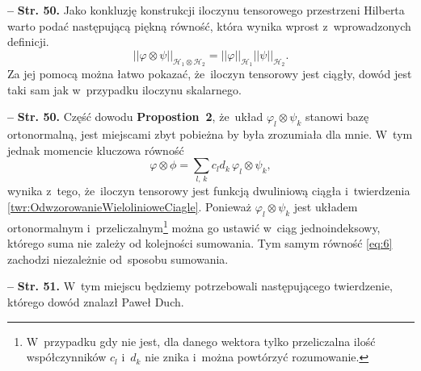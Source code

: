 \documentclass[a4paper,11pt]{article}
\newcommand{\spaceFour}{0.5em}
\newcommand{\tb}{\textbf}
\newcommand{\noi}{\noindent}
\newcommand{\tb}{\textbf}
\newcommand{\noi}{\noindent}
\newcommand{\start}{\noi \tb{--} {}}
\newcommand{\Str}[1]{\tb{Str. #1.}}
\newcommand{\mc}{\mathcal}
\newcommand{\norm}[1]{\left|\left| #1 \right|\right|}
\newcommand{\vp}{\varphi}
\newcommand{\Hc}{\mc{H}}
\newcommand{\ot}{\otimes}
\newcommand{\Sum}{\sum\limits}
\begin{document}

\vspace{\spaceFour}



\start \Str{50} Jako konkluzję konstrukcji iloczynu tensorowego
przestrzeni Hilberta warto podać następującą piękną równość, która
wynika wprost z~wprowadzonych definicji.
\begin{equation*}
  \norm{ \vp \ot \psi }_{ \Hc_{ 1 } \ot \Hc_{ 2 } }
  = \norm{ \vp }_{ \Hc_{ 1 } } \norm{ \psi }_{ \Hc_{ 2 } }.
\end{equation*}
Za jej pomocą można łatwo pokazać, że~iloczyn tensorowy jest ciągły,
dowód jest taki sam jak w~przypadku iloczynu skalarnego. %

\vspace{\spaceFour}



\start \Str{50} Część dowodu \tb{Propostion~2}, że~układ
$\vp_{ l } \ot \psi_{ k }$ stanowi bazę ortonormalną, jest miejscami
zbyt pobieżna by była zrozumiała dla mnie. W~tym jednak momencie
kluczowa równość
\begin{equation}
  \label{eq:6}
  \vp \ot \phi = \Sum_{ l,\, k } c_{ l } d_{ k }\, \vp_{ l } \ot \psi_{ k },
\end{equation}
wynika z~tego, że~iloczyn tensorowy jest funkcją dwuliniową ciągła
i~twierdzenia \eqref{twr:OdwzorowanieWielolinioweCiagle}. Ponieważ
$\vp_{ l } \ot \psi_{ k }$ jest układem ortonormalnym
i~przeliczalnym\footnote{W~przypadku gdy nie jest, dla danego wektora
  tylko przeliczalna ilość współczynników $c_{ l }$ i~$d_{ k }$ nie
  znika i~można powtórzyć rozumowanie.} można go ustawić w~ciąg
jednoindeksowy, którego suma nie zależy od kolejności sumowania. Tym
samym równość \eqref{eq:6} zachodzi niezależnie od~sposobu sumowania.

\vspace{\spaceFour}



\start \Str{51} W~tym miejscu będziemy potrzebowali następującego
twierdzenie, którego dowód znalazł Paweł Duch.
\end{document}
